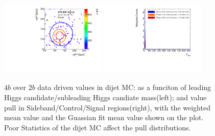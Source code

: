 \begin{figure}[htbp!]
\begin{center}
\includegraphics[width=0.45\textwidth,angle=-90]{figures/boosted/AppendixMuqcdstudy/QCD_FourTag_Incl_mH0H1.pdf}
\includegraphics[width=0.45\textwidth,angle=-90]{figures/boosted/AppendixMuqcdstudy/QCD_FourTag_Incl_mH0H1_pull.pdf}
\caption{$4b$ over $2b$ data driven \muqcd values in dijet MC: \muqcd as a funciton of leading Higgs candidate/subleading Higgs candiate mass(left); and \muqcd value pull in Sideband/Control/Signal regions(right), with the weighted mean value and the Guassian fit mean value shown on the plot. Poor Statistics of the dijet MC affect the pull distributions.}
\label{fig:app-muqcd-4b-qcd}
\end{center}
\end{figure}


